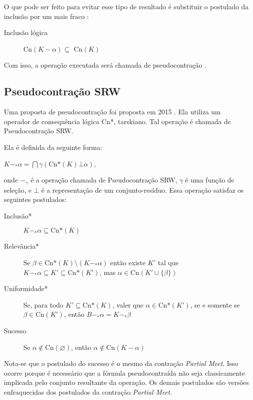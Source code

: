 O que pode ser feito para evitar esse tipo de resultado é substituir o postulado da inclusão por um mais fraco \citep{revisaoHansson3}:

\begin{description}
	\item[Inclusão lógica] Cn$(K - \alpha) \subseteq $ Cn$(K)$ 
\end{description}

Com isso, a operação executada será chamada de pseudocontração \citep{revisaoHansson4}.
\subsection{Pseudocontração SRW}

Uma proposta de pseudocontração foi proposta em 2015 \citep{revisaoSantos}. Ela utiliza um operador de consequência lógica Cn*, tarskiano. Tal operação é chamada de Pseudocontração SRW. 

Ela é definida da seguinte forma:

\begin{center}
	$ K -_* \alpha = \bigcap \gamma(\text{Cn*}(K) \bot \alpha) $,
\end{center}

onde $ -_{\gamma} $ é a operação chamada de Pseudocontração SRW, $ \gamma $ é uma função de seleção, e $ \bot $ é a representação de um conjunto-resíduo. Essa operação satisfaz os seguintes postulados:

\begin{description}
	\item[Inclusão*] $ K -_* \alpha \subseteq \text{Cn*}(K)$
	\item[Relevância*] Se $ \beta \in \text{Cn*}(K) \setminus (K -_* \alpha) $ então existe  $ K' $ tal que $ K -_* \alpha \subseteq K' \subseteq \text{Cn*}(K') $, mas $ \alpha \in \text{Cn}(K' \cup \{\beta\}) $
	\item[Uniformidade*] Se, para todo $K' \subseteq \text{Cn*}(K) $, valer que $ \alpha \in \text{Cn*}(K') $, se e somente se $ \beta \in \text{Cn}(K') $, então $ B -_* \alpha = K -_* \beta $
	\item[Sucesso] Se $ \alpha \notin \text{Cn}(\varnothing) $, então $ \alpha \notin \text{Cn}(K - \alpha) $
\end{description}

Nota-se que o postulado do sucesso é o mesmo da contração \textit{Partial Meet}. Isso ocorre porque é necessário que a fórmula pseudocontraída não seja classicamente implicada pelo conjunto resultante da operação. Os demais postulados são versões enfraquecidas dos postulados da contração \textit{Partial Meet}.